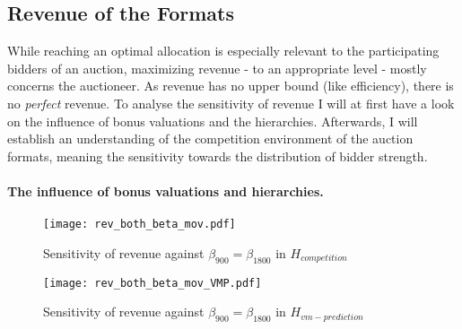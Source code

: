 %	
%	
%

\subsection{Revenue of the Formats}
While reaching an optimal allocation is especially relevant to the participating bidders of an auction, maximizing revenue - to an appropriate level - mostly concerns the auctioneer. As revenue has no upper bound (like efficiency), there is no \textit{perfect} revenue. To analyse the sensitivity of revenue I will at first have a look on the influence of bonus valuations and the hierarchies. Afterwards, I will establish an understanding of the competition environment of the auction formats, meaning the sensitivity towards the distribution of bidder strength.

\paragraph{The influence of bonus valuations and hierarchies.}
\begin{figure}[h]
	\centering
	\texttt{[image: rev\_both\_beta\_mov.pdf]}
	\caption{Sensitivity of revenue against $ \beta_{900} = \beta_{1800} $ in $ H_{competition} $} \label{fig:rev-both-beta-mov}
	
	\vspace*{\floatsep}
	
	\texttt{[image: rev\_both\_beta\_mov\_VMP.pdf]}
	\caption{Sensitivity of revenue against $ \beta_{900} = \beta_{1800} $ in $ H_{vm-prediction} $} \label{fig:rev-both-beta-mov-VMP}
\end{figure}

